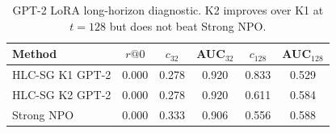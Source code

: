 \begin{table}[h]
\centering
\caption{GPT-2 LoRA long-horizon diagnostic. K2 improves over K1 at $t=128$ but does not beat Strong NPO.}
\label{tab:gpt2-long}
\begin{tabular}{lccccc}
\toprule
Method & $r@0$ & $c_{32}$ & AUC$_{32}$ & $c_{128}$ & AUC$_{128}$ \\
\midrule
HLC-SG K1 GPT-2 & 0.000 & 0.278 & 0.920 & 0.833 & 0.529 \\
HLC-SG K2 GPT-2 & 0.000 & 0.278 & 0.920 & 0.611 & 0.584 \\
Strong NPO & 0.000 & 0.333 & 0.906 & 0.556 & 0.588 \\
\bottomrule
\end{tabular}
\end{table}

